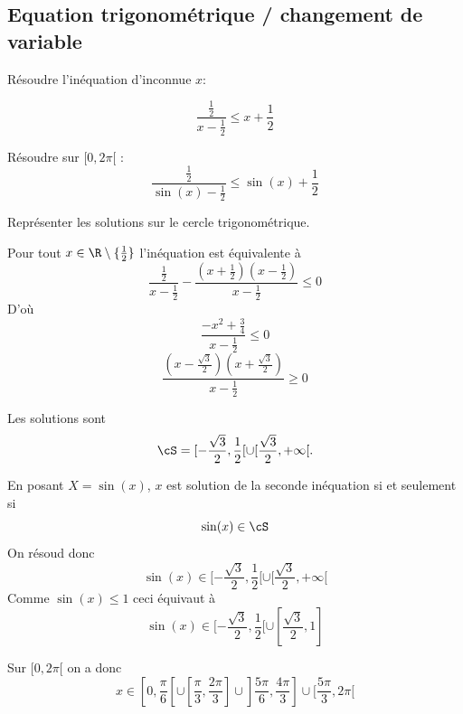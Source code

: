 \subsection{Equation trigonométrique / changement de variable}


\begin{exercice}
Résoudre l'inéquation d'inconnue $x$: 

$$\frac{\frac{1}{2}}{x-\frac{1}{2}}\leq x+\frac{1}{2}$$

Résoudre sur $[0,2\pi[$ :  
$$\frac{\frac{1}{2}}{\sin(x)-\frac{1}{2}}\leq \sin(x)+\frac{1}{2}$$

Représenter les solutions sur le cercle trigonométrique. 
\end{exercice}

\begin{correction}
Pour tout $x\in \R\setminus\{ \frac{1}{2}\}$ l'inéquation est équivalente à 
$$\frac{\frac{1}{2} }{x-\frac{1}{2}} - \frac{(x+\frac{1}{2})(x-\frac{1}{2})}{x-\frac{1}{2}}\leq 0$$
D'où
$$ \frac{-x^2 +\frac{3}{4}}{x-\frac{1}{2}}\leq 0$$
$$\frac{(x-\frac{\sqrt{3}}{2})(x+\frac{\sqrt{3}}{2})}{x-\frac{1}{2}}\geq 0$$

Les solutions sont 
$$\cS  = [-\frac{\sqrt{3}}{2}, \frac{1}{2}[\cup [\frac{\sqrt{3}}{2} , +\infty[.$$

En posant $X= \sin(x)$, $x$ est solution de la seconde inéquation si et seulement si 
$$\sin(x) \in \cS$$
On résoud donc 
$$\sin(x) \in   [-\frac{\sqrt{3}}{2}, \frac{1}{2}[\cup [\frac{\sqrt{3}}{2} , +\infty[$$
Comme $\sin(x)\leq 1$ ceci équivaut à 
$$\sin(x) \in  [-\frac{\sqrt{3}}{2}, \frac{1}{2}[\cup [\frac{\sqrt{3}}{2} , 1]$$

Sur $[0, 2\pi[ $ on a donc 
$$x \in [0, \frac{\pi}{6}[\cup [\frac{\pi}{3}, \frac{2\pi}{3}]\cup ]\frac{5\pi}{6}, 
\frac{4\pi}{3}]\cup [\frac{5\pi}{3}, 2\pi[$$

\end{correction}









